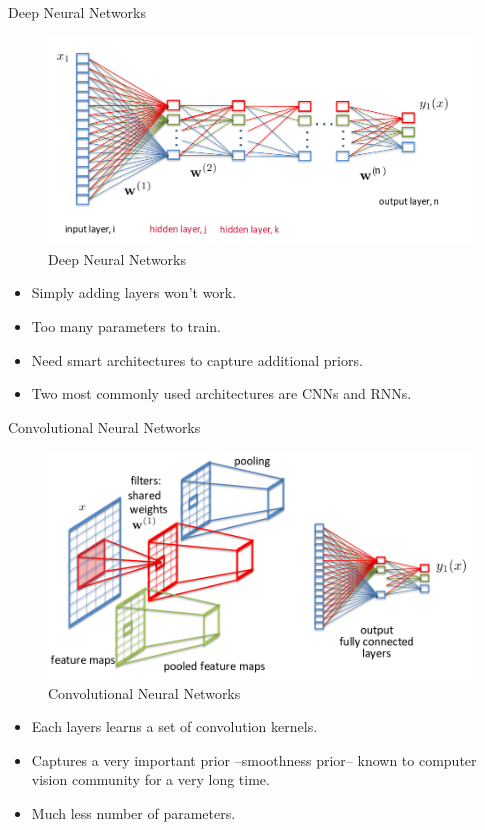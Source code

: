 ﻿\documentclass[aspectratio=43,mathserif,xcolor={usenames,dvipsnames,svgnames,table},10pt]{beamer}
\begin{document}
\begin{frame}{Deep Neural Networks}
 \begin{figure}[h]
    \includegraphics[width=0.7\linewidth]{images/dnn.png}  
    \caption{Deep Neural Networks}
  \end{figure}
  \begin{itemize}
   \item<+-> Simply adding layers won't work.
   \item<+-> Too many parameters to train.
   \item<+-> Need smart architectures to capture additional priors.
   \item<+-> Two most commonly used architectures are CNNs and RNNs.
  \end{itemize}
\end{frame}

\begin{frame}{Convolutional Neural Networks}
\begin{figure}[h]
    \includegraphics[width=0.7\linewidth]{images/cnn.png}  
    \caption{Convolutional Neural Networks}
  \end{figure}
\begin{itemize}
\item<+-> Each layers learns a set of convolution kernels.
\item<+-> Captures a very important prior --smoothness prior-- known to computer vision community for a very long time.
\item<+-> Much less number of parameters.
\end{itemize}
\end{frame}
\end{document}
